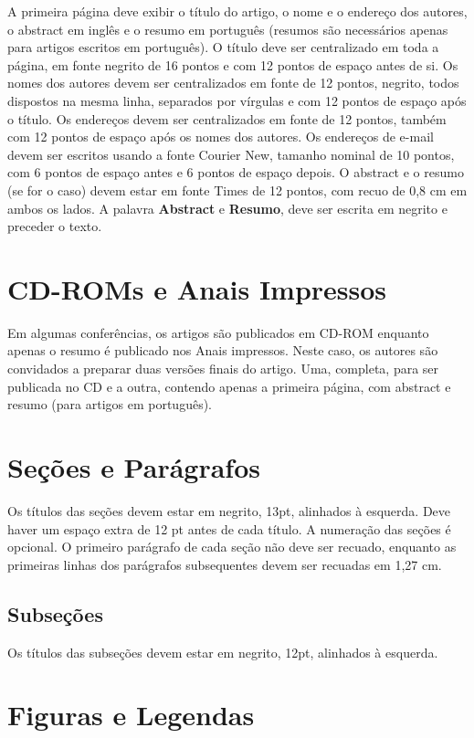 \documentclass[12pt]{article}
\begin{document}
A primeira página deve exibir o título do artigo, o nome e o endereço dos
autores, o abstract em inglês e o resumo em português (resumos são
necessários apenas para artigos escritos em português). O título deve ser centralizado
em toda a página, em fonte negrito de 16 pontos e com 12 pontos de espaço
antes de si. Os nomes dos autores devem ser centralizados em fonte de 12 pontos, negrito, todos
dispostos na mesma linha, separados por vírgulas e com 12 pontos de
espaço após o título. Os endereços devem ser centralizados em fonte de 12 pontos, também com
12 pontos de espaço após os nomes dos autores. Os endereços de e-mail devem ser
escritos usando a fonte Courier New, tamanho nominal de 10 pontos, com 6 pontos de espaço
antes e 6 pontos de espaço depois. O abstract e o resumo (se for o caso) devem estar em fonte Times de 12 pontos,
com recuo de 0,8 cm em ambos os lados. A palavra \textbf{Abstract} e \textbf{Resumo},
deve ser escrita em negrito e preceder o texto.

\section{CD-ROMs e Anais Impressos}

Em algumas conferências, os artigos são publicados em CD-ROM enquanto apenas o
resumo é publicado nos Anais impressos. Neste caso, os autores são
convidados a preparar duas versões finais do artigo. Uma, completa, para ser
publicada no CD e a outra, contendo apenas a primeira página, com
abstract e resumo (para artigos em português).

\section{Seções e Parágrafos}

Os títulos das seções devem estar em negrito, 13pt, alinhados à esquerda. Deve haver um espaço extra
de 12 pt antes de cada título. A numeração das seções é opcional. O primeiro
parágrafo de cada seção não deve ser recuado, enquanto as primeiras linhas dos
parágrafos subsequentes devem ser recuadas em 1,27 cm.

\subsection{Subseções}

Os títulos das subseções devem estar em negrito, 12pt, alinhados à esquerda.

\section{Figuras e Legendas}\label{sec:figs}
\end{document}

